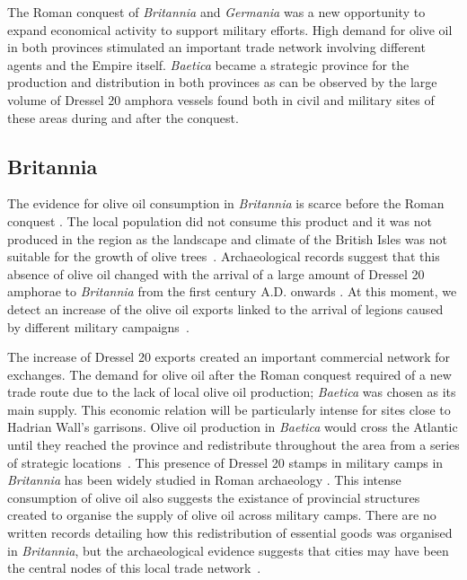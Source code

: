 The Roman conquest of \textit{Britannia} and \textit{Germania} was a new opportunity to expand economical activity to support military efforts. High demand for olive oil in both provinces stimulated an important trade network involving different agents and the Empire itself. \textit{Baetica} became a strategic province for the production and distribution in both provinces as can be observed by the large volume of Dressel 20 amphora vessels found both in civil and military sites of these areas during and after the conquest. 

\subsection{Britannia}
\label{sec:4}

The evidence for olive oil consumption in \textit{Britannia} is scarce before the Roman conquest \citep{funari_corpus_1996,carreras_abastecimiento_2003}. The local population did not consume this product and it was not produced in the region as the landscape and climate of the British Isles was not suitable for the growth of olive trees~\citep[161]{monfort_britanniaen_1998}. Archaeological records suggest that this absence of olive oil changed with the arrival of a large amount of Dressel 20 amphorae to \textit{Britannia} from the first century A.D. onwards \citep{peacock_amphorae_1991,carreras_britannia_1998}. At this moment, we detect an increase of the olive oil exports linked to the arrival of legions caused by different military campaigns~\citep[161]{monfort_britanniaen_1998}. 

The increase of Dressel 20 exports created an important commercial network for exchanges. The demand for olive oil after the Roman conquest required of a new trade route due to the lack of local olive oil production; \textit{Baetica} was chosen as its main supply. This economic relation will be particularly intense for sites close to Hadrian Wall's garrisons. Olive oil production in \textit{Baetica} would cross the Atlantic until they reached the province and redistribute throughout the area from a series of strategic locations~\citep{carreras_atlantic_2012}.  This presence of Dressel 20 stamps in military camps in \textit{Britannia} has been widely studied in Roman archaeology \citep{williams_importation_1983,funari_corpus_1996,carreras_britannia_1998,carreras_abastecimiento_2003}. This intense consumption of olive oil also suggests the existance of provincial structures created to organise the supply of olive oil across military camps. There are no written records detailing how this redistribution of essential goods was organised in \textit{Britannia}, but the archaeological evidence suggests that cities may have been the central nodes of this local trade network~\citep{funari_economic_2005,orengo_seeds_2016}. 

